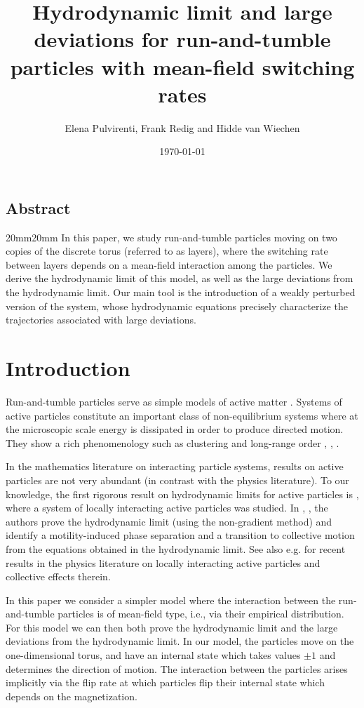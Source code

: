 \documentclass[11pt]{article}
\title{Hydrodynamic limit and large deviations for run-and-tumble particles with mean-field switching rates}
\author{Elena Pulvirenti, Frank Redig and Hidde van Wiechen}
\date{\today}
\numberwithin{equation}{section}
\theoremstyle{definition}
\theoremstyle{plain}
\begin{document}
\maketitle

\begin{center}
    \section*{Abstract}
    \end{center}
\begin{changemargin}{20mm}{20mm}
In this paper, we study run-and-tumble particles moving on two copies of the discrete torus (referred to as layers), where the switching rate between layers depends on a mean-field interaction among the particles. We derive the hydrodynamic limit of this model, as well as the large deviations from the hydrodynamic limit. Our main tool is the introduction of a weakly perturbed version of the system, whose hydrodynamic equations precisely characterize the trajectories associated with large deviations.
\end{changemargin}

\section{Introduction}
Run-and-tumble particles serve as simple models of active matter \cite{Tailleur}. Systems of active particles constitute an important class of non-equilibrium systems where at the microscopic scale energy is dissipated in order to produce directed motion. They show a rich phenomenology such as clustering and long-range order \cite{Tailleur}, \cite{vis}, \cite{schaller2010polar}.

In the mathematics literature on interacting particle systems, results on active particles are not very abundant (in contrast with the physics literature). To our knowledge, the first rigorous result on hydrodynamic limits for active particles is \cite{erignoux}, where a system of locally interacting active particles was studied.  In \cite{bodineau}, \cite{erignoux}, the authors prove the hydrodynamic limit (using the non-gradient method) and identify
a motility-induced phase separation and
a transition to collective motion from the equations obtained in the hydrodynamic limit. See also e.g.
\cite{noguchi2025spatiotemporal} for recent results in the physics literature on locally interacting active particles and collective effects therein.

In this paper we consider a simpler model where the interaction between the run-and-tumble particles is of mean-field type, i.e., via their empirical distribution. For this model we can then both prove the hydrodynamic limit and the large deviations from the hydrodynamic limit.
In our model, the particles move on the one-dimensional torus, and have an internal state which takes values $\pm 1$ and determines the direction of motion.
The interaction between the particles arises  implicitly via the flip rate at which particles flip their internal state which depends on the magnetization.
\end{document}
